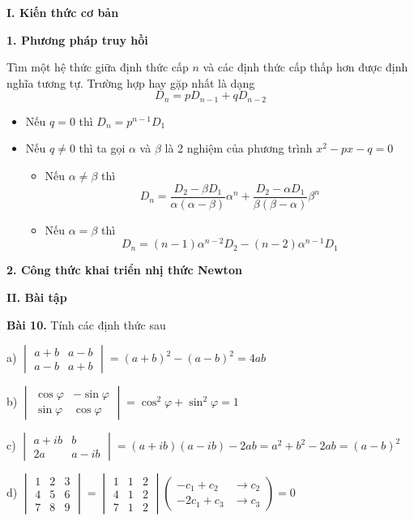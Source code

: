 \documentclass[12pt]{report}
\begin{document}
	

{\large \textbf{I. Kiến thức cơ bản}}

\textbf{1. Phương pháp truy hồi}

Tìm một hệ thức giữa định thức cấp $n$ và các định thức cấp thấp hơn được định nghĩa tương tự. Trường hợp hay gặp nhất là dạng 
\[ D_n = pD_{n-1}+qD_{n-2} \]
\begin{itemize}
	\item Nếu $q=0$ thì $D_n = p^{n-1}D_1$
	\item Nếu $q \neq 0$ thì ta gọi $\alpha$ và $\beta$ là 2 nghiệm của phương trình $x^2-px-q = 0$
	\begin{itemize}
		\item Nếu $\alpha \neq \beta$ thì 
		\[ D_n = \frac{D_2 - \beta D_1}{\alpha (\alpha-\beta)} \alpha^n + \frac{D_2 - \alpha D_1}{\beta (\beta -\alpha)} \beta^n \]
		\item Nếu $\alpha = \beta$ thì 
		\[ D_n = (n-1)\alpha^{n-2}D_2 - (n-2)\alpha^{n-1}D_1 \]
	\end{itemize}
\end{itemize}

\textbf{2. Công thức khai triển nhị thức Newton}

{\large \textbf{II. Bài tập}}

\textbf{Bài 10.} Tính các định thức sau

a) $\begin{vmatrix}
a+b & a-b \\
a-b & a+b
\end{vmatrix} = (a+b)^2 - (a-b)^2 = 4ab$

b) $\begin{vmatrix}
\cos \varphi & -\sin \varphi \\
\sin \varphi & \cos \varphi
\end{vmatrix} = \cos ^ 2 \varphi + \sin ^ 2 \varphi = 1$

c) $\begin{vmatrix}
a+ ib & b \\
2a & a-ib
\end{vmatrix} = (a+ib)(a-ib) - 2ab = a^2 + b^2 - 2ab = (a-b)^2$ 

d) $\begin{vmatrix}
1 & 2 & 3 \\
4 & 5 & 6 \\
7 & 8 & 9
\end{vmatrix} = \begin{vmatrix}
1 & 1 & 2 \\
4 & 1 & 2 \\
7 & 1 & 2
\end{vmatrix} \left( \begin{smallmatrix}
-c_1 + c_2 &\to c_2 \\
-2c_1 + c_3 &\to c_3
\end{smallmatrix}\right) = 0$
\end{document}
